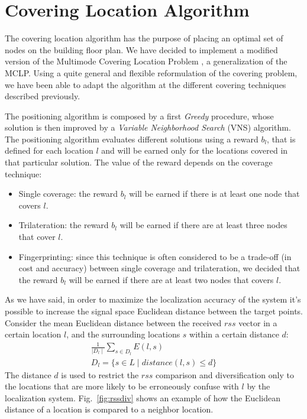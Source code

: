 \section{Covering Location Algorithm}\label{subsec:placing}
The covering location algorithm has the purpose of placing an optimal set of nodes on the building floor plan. We have decided to implement a modified version of the Multimode Covering Location Problem \cite{Colombo2016}, a generalization of the MCLP. Using a quite general and flexible reformulation of the covering problem, we have been able to adapt the algorithm at the different covering techniques described previously.

The positioning algorithm is composed by a first \emph{Greedy} procedure, whose solution is then improved by a \emph{Variable Neighborhood Search} (VNS) algorithm.
The positioning algorithm evaluates different solutions using a reward \(b_l\), that is defined for each location $l$ and will be earned only for the locations covered in that particular solution. The value of the reward depends on the coverage technique:

\begin{itemize}
\item Single coverage: the reward \(b_l\) will be earned if there is at least one node that covers $l$.
\item Trilateration: the reward \(b_l\) will be earned if there are at least three nodes that cover $l$.
\item Fingerprinting: since this technique is often considered to be a trade-off (in cost and accuracy) between single coverage and trilateration, we decided that the reward \(b_l\) will be earned if there are at least two nodes that covers $l$.
\end{itemize}

As we have said, in order to maximize the localization accuracy of the system it's possible to increase the signal space Euclidean distance between the target points.
Consider the mean Euclidean distance between the received $rss$ vector in a certain location \(l\), and the surrounding locations $s$ within a certain distance \(d\):
\begin{equation}\label{eq:fing}
\begin{gathered}
\frac{1}{\mid D_l \mid} \sum\limits_{s \in D_l} E(l,s)\\
D_l = \{s \in L \mid distance(l,s)  \leq d\}
\end{gathered}
\end{equation}
The distance $d$ is used to restrict the $rss$ comparison and diversification only to the locations that are more likely to be erroneously confuse with $l$ by the localization system. Fig.~\ref{fig:rssdiv} shows an example of how the Euclidean distance of a location is compared to a neighbor location.


